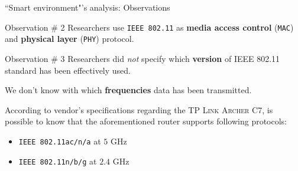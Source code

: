 \documentclass[10pt]{beamer}
\begin{document}
\begin{frame}{``Smart environment"'s analysis: Observations}

\begin{alertblock}{Observation \# 2}
Researchers use \texttt{IEEE 802.11} as \textbf{media access control} (\texttt{MAC}) and \textbf{physical layer} (\texttt{PHY}) protocol.
\end{alertblock}

\begin{alertblock}{Observation \# 3}
Researchers did \textit{not} specify which \textbf{version} of IEEE 802.11 standard has been effectively used. 

We don't know with which \textbf{frequencies} data has been transmitted.
\end{alertblock}

According to vendor's specifications regarding the \textsc{TP Link Archer C7}, is possible to know that the aforementioned router supports following protocols:

\begin{itemize}
\item \texttt{IEEE 802.11ac/n/a} at $5$ GHz
\item \texttt{IEEE 802.11n/b/g} at $2.4$ GHz
\end{itemize}

\end{frame} 
\end{document}
